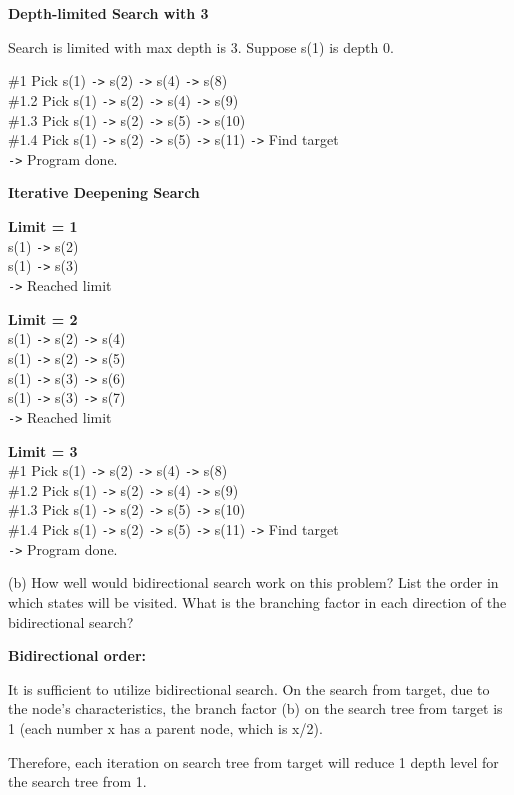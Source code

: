 \documentclass{article}
\begin{document}
\begin{enumerate}
\textbf{Depth-limited Search with 3}

Search is limited with max depth is 3. Suppose s(1) is depth 0.

\#1 Pick s(1) \verb|->| s(2) \verb|->| s(4) \verb|->| s(8) \\
\#1.2 Pick s(1) \verb|->| s(2) \verb|->| s(4) \verb|->| s(9) \\
\#1.3 Pick s(1) \verb|->| s(2) \verb|->| s(5) \verb|->| s(10) \\
\#1.4 Pick s(1) \verb|->| s(2) \verb|->| s(5) \verb|->| s(11) \verb|->| Find target \\
\verb|->| Program done.

\textbf{Iterative Deepening Search}

\textbf{Limit = 1}\\
s(1) \verb|->| s(2)\\
s(1) \verb|->| s(3)\\
\verb|->| Reached limit


\textbf{Limit = 2}\\
s(1) \verb|->| s(2) \verb|->| s(4)\\
s(1) \verb|->| s(2) \verb|->| s(5)\\
s(1) \verb|->| s(3) \verb|->| s(6)\\
s(1) \verb|->| s(3) \verb|->| s(7)\\
\verb|->| Reached limit

\textbf{Limit = 3}\\
\#1 Pick s(1) \verb|->| s(2) \verb|->| s(4) \verb|->| s(8) \\
\#1.2 Pick s(1) \verb|->| s(2) \verb|->| s(4) \verb|->| s(9) \\
\#1.3 Pick s(1) \verb|->| s(2) \verb|->| s(5) \verb|->| s(10) \\
\#1.4 Pick s(1) \verb|->| s(2) \verb|->| s(5) \verb|->| s(11) \verb|->| Find target \\
\verb|->| Program done.

(b) How well would bidirectional search work on this problem? List the order in which states will be visited. What is the branching factor in each direction of the bidirectional search?

\textbf{Bidirectional order:}

It is sufficient to utilize bidirectional search. On the search from target, due to the node's characteristics, the branch factor (b) on the search tree from target is 1 (each number x has a parent node, which is x/2).

Therefore, each iteration on search tree from target will reduce 1 depth level for the search tree from 1.


\end{enumerate}
\end{document}

